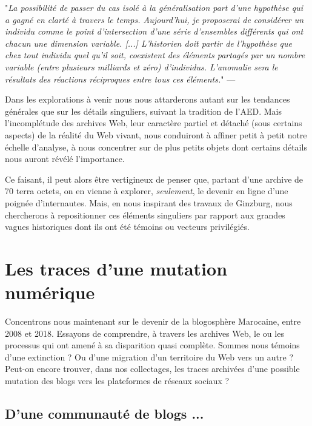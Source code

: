 \documentclass[symmetric,justified,marginals=raggedouter]{tufte-book}
\begin{document}
\begin{fullwidth}
"\textit{La possibilité de passer du cas isolé à la généralisation part d'une hypothèse qui a gagné en clarté à travers le temps. Aujourd'hui, je proposerai de considérer un individu comme le point d'intersection d'une série d'ensembles différents qui ont chacun une dimension variable. [...] L'historien doit partir de l'hypothèse que chez tout individu quel qu'il soit, coexistent des éléments partagés par un nombre variable (entre plusieurs milliards et zéro) d'individus. L'anomalie sera le résultats des réactions réciproques entre tous ces éléments.}" --- \citep[p359-360]{ginzburg_mythes_2012}\\
\end{fullwidth} 

\noindent Dans les explorations à venir nous nous attarderons autant sur les tendances générales que sur les détails singuliers, suivant la tradition de l'AED. Mais l'incomplétude des archives Web, leur caractère partiel et détaché (sous certains aspects) de la réalité du Web vivant, nous conduiront à affiner petit à petit notre échelle d'analyse, à nous concentrer sur de plus petits objets dont certains détails nous auront révélé l'importance. 

Ce faisant, il peut alors être vertigineux de penser que, partant d'une archive de 70 terra octets, on en vienne à explorer, \textit{seulement}, le devenir en ligne d'une poignée d'internautes. Mais, en nous inspirant des travaux de Ginzburg, nous chercherons à repositionner ces éléments singuliers par rapport aux grandes vagues historiques dont ils ont été témoins ou vecteurs privilégiés. 

\section{Les traces d'une mutation numérique}

\noindent Concentrons nous maintenant sur le devenir de la blogosphère Marocaine, entre 2008 et 2018. Essayons de comprendre, à travers les archives Web, le ou les processus qui ont amené à sa disparition quasi complète. Sommes nous témoins d'une extinction ? Ou d'une migration d'un territoire du Web vers un autre ? Peut-on encore trouver, dans nos collectages, les traces archivées d'une possible mutation des blogs vers les plateformes de réseaux sociaux ? 

\subsection{D'une communauté de blogs ...}
\end{document}

